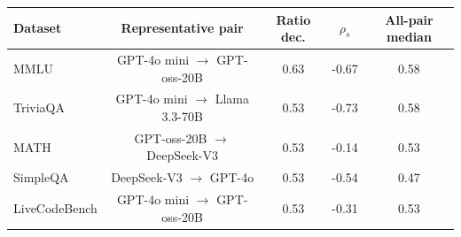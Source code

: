 \begin{tabular}{lcccc}
\toprule
Dataset & Representative pair & Ratio dec. & $\rho_s$ & All-pair median \\
\midrule
MMLU & GPT-4o mini $\to$ GPT-oss-20B & 0.63 & -0.67 & 0.58 \\
TriviaQA & GPT-4o mini $\to$ Llama 3.3-70B & 0.53 & -0.73 & 0.58 \\
MATH & GPT-oss-20B $\to$ DeepSeek-V3 & 0.53 & -0.14 & 0.53 \\
SimpleQA & DeepSeek-V3 $\to$ GPT-4o & 0.53 & -0.54 & 0.47 \\
LiveCodeBench & GPT-4o mini $\to$ GPT-oss-20B & 0.53 & -0.31 & 0.53 \\
\bottomrule
\end{tabular}
